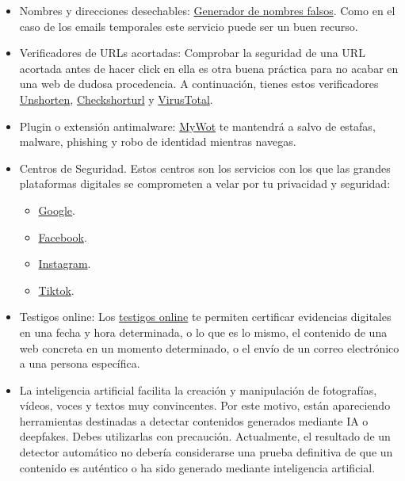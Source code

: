 \documentclass[
  spanish,
  a4paper,
  openany]{book}
\begin{document}
\begin{itemize}
\item
  Nombres y direcciones desechables: \href{https://www.fakenamegenerator.com}{Generador de nombres falsos}. Como en el caso de los emails temporales este servicio puede ser un buen recurso.
\item
  Verificadores de URLs acortadas: Comprobar la seguridad de una URL acortada antes de hacer click en ella es otra buena práctica para no acabar en una web de dudosa procedencia. A continuación, tienes estos verificadores \href{https://unshorten.it/}{Unshorten}, \href{https://checkshorturl.com/}{Checkshorturl} y \href{https://www.virustotal.com/gui/home/url}{VirusTotal}.
\item
  Plugin o extensión antimalware: \href{https://www.mywot.com/}{MyWot} te mantendrá a salvo de estafas, malware, phishing y robo de identidad mientras navegas.
\item
  Centros de Seguridad. Estos centros son los servicios con los que las grandes plataformas digitales se comprometen a velar por tu privacidad y seguridad:

  \begin{itemize}
  \item
    \href{https://safety.google}{Google}.
  \item
    \href{https://es-es.facebook.com/safety}{Facebook}.
  \item
    \href{https://about.instagram.com/es-la/community/safety}{Instagram}.
  \item
    \href{https://www.tiktok.com/safety?lang=es}{Tiktok}.
  \end{itemize}
\item
  Testigos online: Los \href{https://www.incibe.es/ciudadania/blog/testigos-online-y-obtencion-de-pruebas-te-explicamos-su-utilidad}{testigos online} te permiten certificar evidencias digitales en una fecha y hora determinada, o lo que es lo mismo, el contenido de una web concreta en un momento determinado, o el envío de un correo electrónico a una persona específica.
\item
  La inteligencia artificial facilita la creación y manipulación de fotografías, vídeos, voces y textos muy convincentes. Por este motivo, están apareciendo herramientas destinadas a detectar contenidos generados mediante IA o deepfakes. Debes utilizarlas con precaución. Actualmente, el resultado de un detector automático no debería considerarse una prueba definitiva de que un contenido es auténtico o ha sido generado mediante inteligencia artificial.
\end{itemize}
\end{document}
